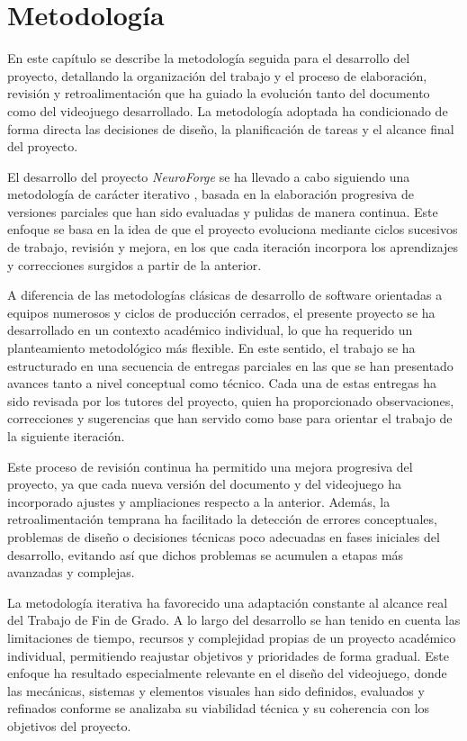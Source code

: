 \chapter{Metodología}

En este capítulo se describe la metodología seguida para el desarrollo del proyecto, detallando la organización del trabajo y el proceso de elaboración, revisión y retroalimentación que ha guiado la evolución tanto del documento como del videojuego desarrollado. La metodología adoptada ha condicionado de forma directa las decisiones de diseño, la planificación de tareas y el alcance final del proyecto.

El desarrollo del proyecto \textit{NeuroForge} se ha llevado a cabo siguiendo una metodología de carácter iterativo \cite{DesarrolloIterativo}, basada en la elaboración progresiva de versiones parciales que han sido evaluadas y pulidas de manera continua. Este enfoque se basa en la idea de que el proyecto evoluciona mediante ciclos sucesivos de trabajo, revisión y mejora, en los que cada iteración incorpora los aprendizajes y correcciones surgidos a partir de la anterior.

A diferencia de las metodologías clásicas de desarrollo de software orientadas a equipos numerosos y ciclos de producción cerrados, el presente proyecto se ha desarrollado en un contexto académico individual, lo que ha requerido un planteamiento metodológico más flexible. En este sentido, el trabajo se ha estructurado en una secuencia de entregas parciales en las que se han presentado avances tanto a nivel conceptual como técnico. Cada una de estas entregas ha sido revisada por los tutores del proyecto, quien ha proporcionado observaciones, correcciones y sugerencias que han servido como base para orientar el trabajo de la siguiente iteración.

Este proceso de revisión continua ha permitido una mejora progresiva del proyecto, ya que cada nueva versión del documento y del videojuego ha incorporado ajustes y ampliaciones respecto a la anterior. Además, la retroalimentación temprana ha facilitado la detección de errores conceptuales, problemas de diseño o decisiones técnicas poco adecuadas en fases iniciales del desarrollo, evitando así que dichos problemas se acumulen a etapas más avanzadas y complejas.

La metodología iterativa ha favorecido una adaptación constante al alcance real del Trabajo de Fin de Grado. A lo largo del desarrollo se han tenido en cuenta las limitaciones de tiempo, recursos y complejidad propias de un proyecto académico individual, permitiendo reajustar objetivos y prioridades de forma gradual. Este enfoque ha resultado especialmente relevante en el diseño del videojuego, donde las mecánicas, sistemas y elementos visuales han sido definidos, evaluados y refinados conforme se analizaba su viabilidad técnica y su coherencia con los objetivos del proyecto.

